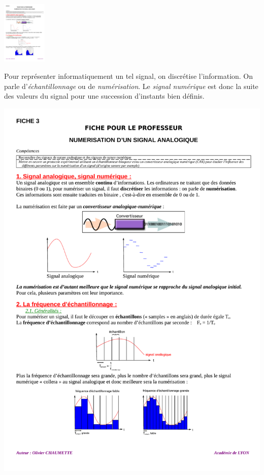 \documentclass[10pt,fleqn]{article} %
\begin{document}
\begin{multicols}{2}
\centerline{\includegraphics[height=3cm]{images/theme_son_2_fig_1}}

Pour représenter informatiquement un tel signal, on discrétise
l'information. On parle d'\emph{échantillonnage} ou de
\emph{numérisation}. Le \emph{signal numérique} est donc la suite des
valeurs du signal pour une succession d'instants bien définis. 

\centerline{\includegraphics[width=\linewidth]{images/theme_son_2_fig_2}}


\end{multicols}
\end{document}
